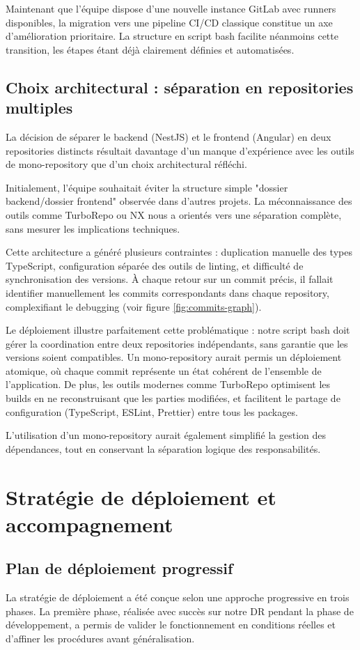 Maintenant que l'équipe dispose d'une nouvelle instance GitLab avec runners disponibles, la migration vers une pipeline CI/CD classique constitue un axe d'amélioration prioritaire. La structure en script bash facilite néanmoins cette transition, les étapes étant déjà clairement définies et automatisées.

\subsection{Choix architectural : séparation en repositories multiples}
La décision de séparer le backend (NestJS) et le frontend (Angular) en deux repositories distincts résultait davantage d'un manque d'expérience avec les outils de mono-repository que d'un choix architectural réfléchi.

Initialement, l'équipe souhaitait éviter la structure simple "dossier backend/dossier frontend" observée dans d'autres projets. La méconnaissance des outils comme TurboRepo ou NX nous a orientés vers une séparation complète, sans mesurer les implications techniques.

Cette architecture a généré plusieurs contraintes : duplication manuelle des types TypeScript, configuration séparée des outils de linting, et difficulté de synchronisation des versions. À chaque retour sur un commit précis, il fallait identifier manuellement les commits correspondants dans chaque repository, complexifiant le debugging (voir figure \ref{fig:commits-graph}).

Le déploiement illustre parfaitement cette problématique : notre script bash doit gérer la coordination entre deux repositories indépendants, sans garantie que les versions soient compatibles.
Un mono-repository aurait permis un déploiement atomique, où chaque commit représente un état cohérent de l'ensemble de l'application.
De plus, les outils modernes comme TurboRepo optimisent les builds en ne reconstruisant que les parties modifiées, et facilitent le partage de configuration (TypeScript, ESLint, Prettier) entre tous les packages.

L'utilisation d'un mono-repository aurait également simplifié la gestion des dépendances, tout en conservant la séparation logique des responsabilités.


\section{Stratégie de déploiement et accompagnement}

\subsection{Plan de déploiement progressif}
La stratégie de déploiement a été conçue selon une approche progressive en trois phases.
La première phase, réalisée avec succès sur notre DR pendant la phase de développement, a permis de valider le fonctionnement en conditions réelles et d'affiner les procédures avant généralisation.

